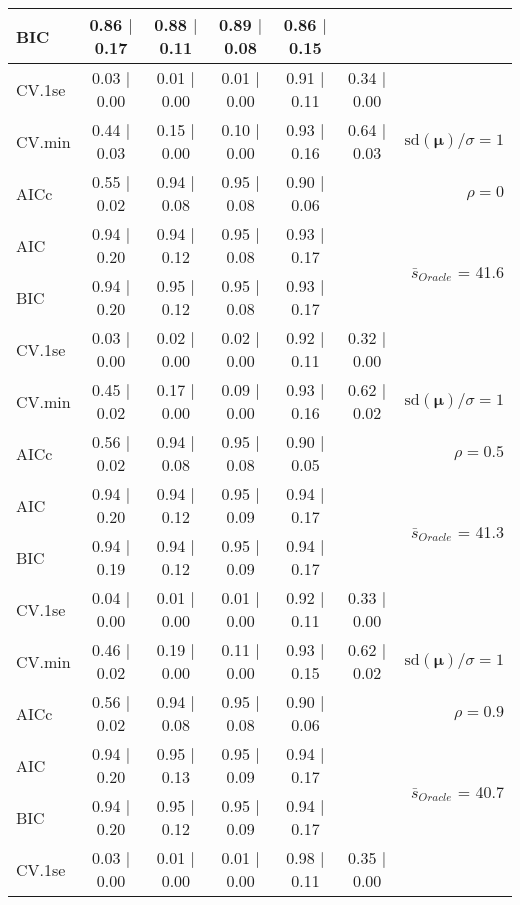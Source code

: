 \begin{table}
\begin{center}
\begin{tabular}{l*{5}{c}|r}
BIC & 0.86 $\mid$ 0.17 & 0.88 $\mid$ 0.11 & 0.89 $\mid$ 0.08 & 0.86 $\mid$ 0.15 & &  \\
 \hline 
CV.1se & 0.03 $\mid$ 0.00 & 0.01 $\mid$ 0.00 & 0.01 $\mid$ 0.00 & 0.91 $\mid$ 0.11 & 0.34 $\mid$ 0.00 & \\
CV.min & 0.44 $\mid$ 0.03 & 0.15 $\mid$ 0.00 & 0.10 $\mid$ 0.00 & 0.93 $\mid$ 0.16 & 0.64 $\mid$ 0.03 &  $\mathrm{sd}(\mathbf{\mu})/\sigma=1$ \\
AICc & 0.55 $\mid$ 0.02 & 0.94 $\mid$ 0.08 & 0.95 $\mid$ 0.08 & 0.90 $\mid$ 0.06 & & $\rho=0$ \\
AIC & 0.94 $\mid$ 0.20 & 0.94 $\mid$ 0.12 & 0.95 $\mid$ 0.08 & 0.93 $\mid$ 0.17 & &  \multirow{2}{*}{$\bar{s}_{Oracle}$ = 41.6} \\
BIC & 0.94 $\mid$ 0.20 & 0.95 $\mid$ 0.12 & 0.95 $\mid$ 0.08 & 0.93 $\mid$ 0.17 & &  \\
 \hline 
CV.1se & 0.03 $\mid$ 0.00 & 0.02 $\mid$ 0.00 & 0.02 $\mid$ 0.00 & 0.92 $\mid$ 0.11 & 0.32 $\mid$ 0.00 & \\
CV.min & 0.45 $\mid$ 0.02 & 0.17 $\mid$ 0.00 & 0.09 $\mid$ 0.00 & 0.93 $\mid$ 0.16 & 0.62 $\mid$ 0.02 &  $\mathrm{sd}(\mathbf{\mu})/\sigma=1$ \\
AICc & 0.56 $\mid$ 0.02 & 0.94 $\mid$ 0.08 & 0.95 $\mid$ 0.08 & 0.90 $\mid$ 0.05 & & $\rho=0.5$ \\
AIC & 0.94 $\mid$ 0.20 & 0.94 $\mid$ 0.12 & 0.95 $\mid$ 0.09 & 0.94 $\mid$ 0.17 & &  \multirow{2}{*}{$\bar{s}_{Oracle}$ = 41.3} \\
BIC & 0.94 $\mid$ 0.19 & 0.94 $\mid$ 0.12 & 0.95 $\mid$ 0.09 & 0.94 $\mid$ 0.17 & &  \\
 \hline 
CV.1se & 0.04 $\mid$ 0.00 & 0.01 $\mid$ 0.00 & 0.01 $\mid$ 0.00 & 0.92 $\mid$ 0.11 & 0.33 $\mid$ 0.00 & \\
CV.min & 0.46 $\mid$ 0.02 & 0.19 $\mid$ 0.00 & 0.11 $\mid$ 0.00 & 0.93 $\mid$ 0.15 & 0.62 $\mid$ 0.02 &  $\mathrm{sd}(\mathbf{\mu})/\sigma=1$ \\
AICc & 0.56 $\mid$ 0.02 & 0.94 $\mid$ 0.08 & 0.95 $\mid$ 0.08 & 0.90 $\mid$ 0.06 & & $\rho=0.9$ \\
AIC & 0.94 $\mid$ 0.20 & 0.95 $\mid$ 0.13 & 0.95 $\mid$ 0.09 & 0.94 $\mid$ 0.17 & &  \multirow{2}{*}{$\bar{s}_{Oracle}$ = 40.7} \\
BIC & 0.94 $\mid$ 0.20 & 0.95 $\mid$ 0.12 & 0.95 $\mid$ 0.09 & 0.94 $\mid$ 0.17 & &  \\
 \hline 
CV.1se & 0.03 $\mid$ 0.00 & 0.01 $\mid$ 0.00 & 0.01 $\mid$ 0.00 & 0.98 $\mid$ 0.11 & 0.35 $\mid$ 0.00 & \\

\end{tabular}
\end{center}
\end{table}
